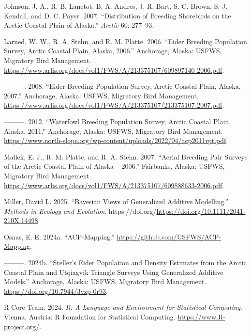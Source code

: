 \documentclass[
]{article}
\newlength{\cslhangindent}
\newenvironment{CSLReferences}[2] %
 {\begin{list}{}{%
  \setlength{\itemindent}{0pt}
  \setlength{\leftmargin}{0pt}
  \setlength{\parsep}{0pt}
  \ifodd #1
   \setlength{\leftmargin}{\cslhangindent}
   \setlength{\itemindent}{-1\cslhangindent}
  \fi
  \setlength{\itemsep}{#2\baselineskip}}}
 {\end{list}}
\begin{document}
\begin{CSLReferences}{1}{0}
Johnson, J. A., R. B. Lanctot, B. A. Andres, J. R. Bart, S. C. Brown, S.
J. Kendall, and D. C. Payer. 2007. {``Distribution of Breeding
Shorebirds on the Arctic Coastal Plain of Alaska.''} \emph{Arctic} 60:
277--93.

Larned, W. W., R. A. Stehn, and R. M. Platte. 2006. {``Eider Breeding
Population Survey, Arctic Coastal Plain, Alaska, 2006.''} Anchorage,
Alaska: USFWS, Migratory Bird Management.
\url{https://www.arlis.org/docs/vol1/FWS/A/213375107/609897140-2006.pdf}.

---------. 2008. {``Eider Breeding Population Survey, Arctic Coastal
Plain, Alaska, 2007.''} Anchorage, Alaska: USFWS, Migratory Bird
Management.
\url{https://www.arlis.org/docs/vol1/FWS/A/213375107/213375107-2007.pdf}.

---------. 2012. {``Waterfowl Breeding Population Survey, Arctic Coastal
Plain, Alaska, 2011.''} Anchorage, Alaska: USFWS, Migratory Bird
Management.
\url{https://www.north-slope.org/wp-content/uploads/2022/04/acp2011rpt.pdf}.

Mallek, E. J., R. M. Platte, and R. A. Stehn. 2007. {``Aerial Breeding
Pair Surveys of the Arctic Coastal Plain of Alaska -- 2006.''}
Fairbanks, Alaska: USFWS, Migratory Bird Management.
\url{https://www.arlis.org/docs/vol1/FWS/A/213375107/609888633-2006.pdf}.

Miller, David L. 2025. {``Bayesian Views of Generalized Additive
Modelling.''} \emph{Methods in Ecology and Evolution}.
https://doi.org/\url{https://doi.org/10.1111/2041-210X.14498}.

Osnas, E. E. 2024a. {``ACP-Mapping.''}
\url{https://github.com/USFWS/ACP-Mapping}.

---------. 2024b. {``Steller's Eider Population and Density Estimates
from the Arctic Coastal Plain and Utqiagvik Triangle Surveys Using
Generalized Additive Models.''} Anchorage, Alaska: USFWS, Migratory Bird
Management. \url{https://doi.org/10.7944/3vzp-0r93}.

R Core Team. 2024. \emph{R: A Language and Environment for Statistical
Computing}. Vienna, Austria: R Foundation for Statistical Computing.
\url{https://www.R-project.org/}.


\end{CSLReferences}
\end{document}

